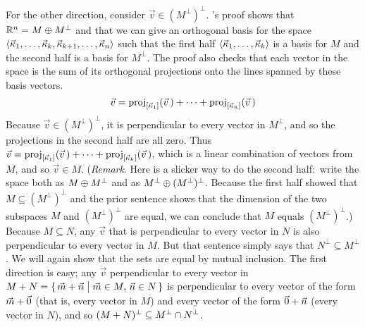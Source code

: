 \begin{exercises}
\begin{answer}
\begin{exparts}
          For the other direction, consider $\vec{v}\in (M^\perp)^\perp$.
          's proof shows that  
          $\Re^n=M\directsum M^\perp$ and that
          we can give an orthogonal basis for the space 
          $\sequence{\vec{\kappa}_1,\dots,\vec{\kappa}_k,
                        \vec{\kappa}_{k+1},\dots,\vec{\kappa}_n}$
          such that the first half
          $\sequence{\vec{\kappa}_1,\dots,\vec{\kappa}_k}$ is a basis for
          $M$ and the second half is a basis for $M^\perp$.
          The proof also checks that
          each vector in the space is the sum of its orthogonal projections 
          onto the lines spanned by these basis vectors.
          \begin{equation*}
             \vec{v}=\proj{\vec{v}\,}{\spanof{\vec{\kappa}_1}}
                          +\dots+\proj{\vec{v}\,}{\spanof{\vec{\kappa}_n}}
          \end{equation*}
          Because $\vec{v}\in (M^\perp)^\perp$, it is perpendicular to 
          every vector in $M^\perp$, and so the projections in 
          the second half are all zero. 
          Thus $\vec{v}=\proj{\vec{v}\,}{\spanof{\vec{\kappa}_1}}
                          +\dots+\proj{\vec{v}\,}{\spanof{\vec{\kappa}_k}}$,
          which is a linear combination of vectors from $M$, and 
          so $\vec{v}\in M$.
          (\textit{Remark}.
           Here is a slicker way to do the second half:~write the space
           both as $M\directsum M^\perp$ and as 
           $M^\perp\directsum (M^\perp)^\perp$.
           Because the first half showed that $M\subseteq (M^\perp)^\perp$
           and the prior sentence shows that the dimension of the two
           subspaces $M$ and $(M^\perp)^\perp$ are equal, we can conclude
           that $M$ equals $(M^\perp)^\perp$.)
        \partsitem Because $M\subseteq N$, any $\vec{v}$ that is perpendicular
           to every vector in $N$ is also perpendicular to every vector in 
           $M$.
           But that sentence simply says that $N^\perp\subseteq M^\perp$.
        \partsitem We will again show that the sets are equal by mutual 
           inclusion.
           The first direction is easy; any $\vec{v}$ perpendicular to
           every vector in 
           $M+N=\set{\vec{m}+\vec{n}\suchthat \vec{m}\in M,\, \vec{n}\in N}$
           is perpendicular to every vector of the form $\vec{m}+\zero$
           (that is, every vector in $M$) and every vector of the form
           $\zero+\vec{n}$ (every vector in $N$), and so 
           $(M+N)^\perp\subseteq M^\perp\intersection N^\perp$. 

\end{exparts}
\end{answer}
\end{exercises}
